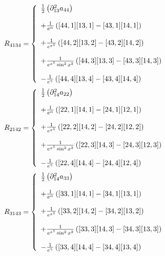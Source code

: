 \begin{align}
R_{4134}&= \left\{\begin{array}{l}
\frac{1}{2}\left(\partial^2_{13} a_{44}\right)\\\\
+ \frac{1}{e^{\alpha}}\left( [44,1] [13,1] -[43,1] [14,1]  \right)\\\\
+ \frac{1}{e^{x^1}}\left( [44,2] [13,2] -[43,2] [14,2]  \right)\\\\
+ \frac{1}{e^{x^1}\sin^2 x^2}\left( [44,3] [13,3] -[43,3] [14,3]  \right)\\\\
-\frac{1}{e^{\gamma}}\left( [44,4] [13,4] -[43,4] [14,4]  \right)
\end {array}\right.\\
\end{align}
\begin{align}
R_{2142}&= \left\{\begin{array}{l}
\frac{1}{2}\left(\partial^2_{14} a_{22}\right)\\\\
+ \frac{1}{e^{\alpha}}\left( [22,1] [14,1] -[24,1] [12,1]  \right)\\\\
+ \frac{1}{e^{x^1}}\left( [22,2] [14,2] -[24,2] [12,2]  \right)\\\\
+ \frac{1}{e^{x^1}\sin^2 x^2}\left( [22,3] [14,3] -[24,3] [12,3]  \right)\\\\
-\frac{1}{e^{\gamma}}\left( [22,4] [14,4] -[24,4] [12,4]  \right)
\end {array}\right.\\
\end{align}
\begin{align}
R_{3143}&= \left\{\begin{array}{l}
\frac{1}{2}\left(\partial^2_{14} a_{33}\right)\\\\
+ \frac{1}{e^{\alpha}}\left( [33,1] [14,1] -[34,1] [13,1]  \right)\\\\
+ \frac{1}{e^{x^1}}\left( [33,2] [14,2] -[34,2] [13,2]  \right)\\\\
+ \frac{1}{e^{x^1}\sin^2 x^2}\left( [33,3] [14,3] -[34,3] [13,3]  \right)\\\\
-\frac{1}{e^{\gamma}}\left( [33,4] [14,4] -[34,4] [13,4]  \right)
\end {array}\right.\\
\end{align}
